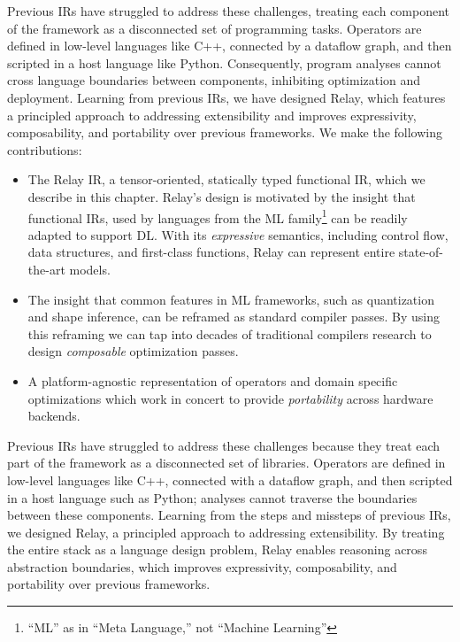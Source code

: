   Previous IRs have struggled to address these challenges, treating each
    component of the framework as a disconnected set of programming tasks.
  Operators are defined in low-level languages like C++,
    connected by a dataflow graph, and then scripted
    in a host language like Python.
  Consequently,
    program analyses cannot cross language boundaries between components,
    inhibiting optimization and deployment.
  Learning from previous IRs, we have designed Relay,
    which features a principled approach to addressing extensibility
    and improves expressivity, composability, and portability
    over previous frameworks.
  We make the following contributions:
  \begin{itemize}
    \item The Relay IR, a tensor-oriented, statically typed
      functional IR,
      which we describe in this chapter.
    Relay's design is motivated by the insight that functional IRs, used by
    languages from the ML family\footnote{``ML'' as in ``Meta Language,'' not
    ``Machine Learning''} can be readily adapted to support DL.
    With its \textit{expressive} semantics,
      including control flow, data structures, and first-class functions,
      Relay can represent entire state-of-the-art models.
    \item The insight that common features in ML frameworks,
      such as quantization and shape inference,
      can be reframed as standard compiler passes.
    By using this reframing we can tap into
      decades of traditional compilers research to design
      \textit{composable} optimization passes.
    \item
      A platform-agnostic representation of operators and domain specific
        optimizations which work in concert to provide \textit{portability}
        across hardware backends.
  \end{itemize}
  Previous IRs have struggled to address these challenges because they treat
  each part of the framework as a disconnected set of libraries.
Operators are defined in low-level languages like C++,
  connected with a dataflow graph, and then scripted
  in a host language such as Python;
  analyses cannot traverse the boundaries between these components.
Learning from the steps and missteps of previous IRs, we designed Relay,
  a principled approach to addressing extensibility.
By treating the entire stack as a language
  design problem, Relay enables reasoning across
  abstraction boundaries, which
  improves expressivity, composability, and portability over previous frameworks.
